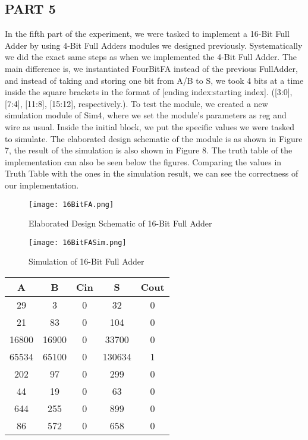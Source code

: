 \documentclass[pdftex,12pt,a4paper]{article}
\begin{document}
\subsection{PART 5}
In the fifth part of the experiment, we were tasked to implement a 16-Bit Full Adder by using 4-Bit Full Adders modules we designed previously. Systematically we did the exact same steps as when we implemented the 4-Bit Full Adder. The main difference is, we instantiated FourBitFA instead of the previous FullAdder, and instead of taking and storing one bit from A/B to S, we took 4 bits at a time inside the square brackets in the format of [ending index:starting index]. ([3:0], [7:4], [11:8], [15:12], respectively.). To test the module, we created a new simulation module of Sim4, where we set the module's parameters as reg and wire as usual. Inside the initial block, we put the specific values we were tasked to simulate. The elaborated design schematic of the module is as shown in Figure 7, the result of the simulation is also shown in Figure 8. The truth table of the implementation can also be seen below the figures. Comparing the values in Truth Table with the ones in the simulation result, we can see the correctness of our implementation.

\begin{figure}[ht]
	\centering
	\texttt{[image: 16BitFA.png]}
	\caption{Elaborated Design Schematic of 16-Bit Full Adder}
	\label{fig1}
\end{figure}

\begin{figure}[ht]
	\centering
	\texttt{[image: 16BitFASim.png]}
	\caption{Simulation of 16-Bit Full Adder}
	\label{fig1}
\end{figure}

\begin{center}
 \begin{tabular}{|c|c|c|c|c|} 
 \hline
 A & B & Cin & S & Cout  \\ 
 \hline\hline
 29 & 3 & 0 & 32 & 0\\ 
 \hline
 21 & 83 & 0 & 104 & 0\\
 \hline
 16800 & 16900 & 0 & 33700 & 0\\
 \hline
 65534 & 65100 & 0 & 130634 & 1\\
 \hline
 202 & 97 & 0 & 299 & 0\\
 \hline
 44 & 19 & 0 & 63 & 0\\
 \hline
 644 & 255 & 0 & 899 & 0\\
 \hline
 86 & 572 & 0 & 658 & 0\\
  \hline
\end{tabular}
\end{center}
\end{document}
